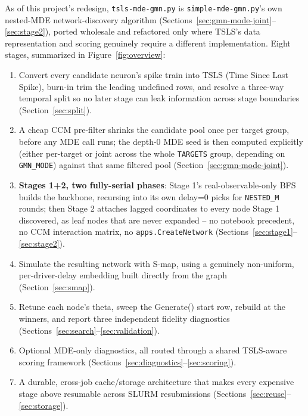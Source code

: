 \documentclass[11pt]{article}
\begin{document}
As of this project's redesign, \texttt{tsls-mde-gmn.py} is \texttt{simple-mde-gmn.py}'s own nested-MDE network-discovery algorithm (Sections~\ref{sec:gmn-mode-joint}--\ref{sec:stage2}), ported wholesale and refactored only where TSLS's data representation and scoring genuinely require a different implementation. Eight stages, summarized in Figure~\ref{fig:overview}:
\begin{enumerate}[leftmargin=1.4em]
  \item Convert every candidate neuron's spike train into TSLS (Time Since Last Spike), burn-in trim the leading undefined rows, and resolve a three-way temporal split so no later stage can leak information across stage boundaries (Section~\ref{sec:split}).
  \item A cheap CCM pre-filter shrinks the candidate pool once per target group, before any MDE call runs; the depth-0 MDE seed is then computed explicitly (either per-target or joint across the whole \texttt{TARGETS} group, depending on \texttt{GMN\_MODE}) against that same filtered pool (Section~\ref{sec:gmn-mode-joint}).
  \item \textbf{Stages 1+2, two fully-serial phases}: Stage 1's real-observable-only BFS builds the backbone, recursing into its own delay=0 picks for \texttt{NESTED\_M} rounds; then Stage 2 attaches lagged coordinates to every node Stage 1 discovered, as leaf nodes that are never expanded -- no notebook precedent, no CCM interaction matrix, no \texttt{apps.CreateNetwork} (Sections~\ref{sec:stage1}--\ref{sec:stage2}).
  \item Simulate the resulting network with S-map, using a genuinely non-uniform, per-driver-delay embedding built directly from the graph (Section~\ref{sec:smap}).
  \item Retune each node's theta, sweep the Generate() start row, rebuild at the winners, and report three independent fidelity diagnostics (Sections~\ref{sec:search}--\ref{sec:validation}).
  \item Optional MDE-only diagnostics, all routed through a shared TSLS-aware scoring framework (Sections~\ref{sec:diagnostics}--\ref{sec:scoring}).
  \item A durable, cross-job cache/storage architecture that makes every expensive stage above resumable across SLURM resubmissions (Sections~\ref{sec:reuse}--\ref{sec:storage}).
\end{enumerate}
\end{document}
